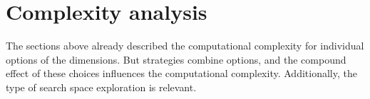 \documentclass[smallextended]{svjour3}
\newcommand{\dimension}{\emph}
\newcommand{\parameter}{\emph}
\newcommand{\fine}{\parameter{fine}}
\newcommand{\coarse}{\parameter{coarse}}
\newcommand{\all}{\parameter{all}}
\newcommand{\best}{\parameter{best}}
\begin{document}






\section{Complexity analysis}
\label{section:complexity-analysis}

The sections above already described the computational complexity for individual options of the dimensions.
But strategies combine options, and the compound effect of these choices influences the computational complexity.
Additionally, the type of search space exploration is relevant.
\end{document}
